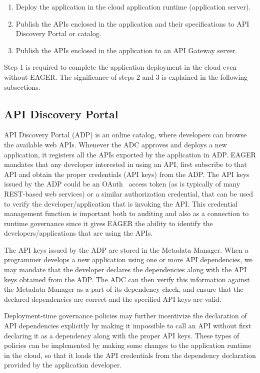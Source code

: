 \begin{enumerate}
\item Deploy the application in the cloud application runtime (application server).
\item Publish the APIs enclosed in the application and their specifications to
API Discovery Portal or catalog.
\item Publish the APIs enclosed in the application to an API Gateway server.
\end{enumerate}

Step 1 is required to complete the application deployment in the cloud even without EAGER. The significance of steps 2 and 3 is explained in the 
following subsections.

\subsection{API Discovery Portal} API Discovery Portal (ADP) is an online
catalog, where developers can browse the available web APIs. Whenever the ADC
approves and deploys a new application, it registers all the APIs exported by
the application in ADP.  EAGER mandates that any developer interested in using
an API, first subscribe to that API and obtain the proper credentials (API
keys) from the ADP. The API keys issued by the ADP could be an
OAuth~\cite{XXXOAuthXXXX} access
token (as is typically of many REST-based web services) 
or a similar authorization credential, that can be used to verify the
developer/application that is invoking the API. This credential management
function is
important both to auditing and also as a connection to
runtime governance since it gives EAGER the ability to identify
the developers/applications that are using the APIs. 

The API keys issued by the ADP are stored in the Metadata Manager. When a
programmer develops a new application using one or more API dependencies, we
may mandate that the developer declares the dependencies along with the API
keys obtained from the ADP. The ADC can then verify this information against
the Metadata Manager as a part of its dependency check, and ensure that the
declared dependencies are correct and the specified API keys are valid. 

Deployment-time governance policies
may further incentivize the declaration of API 
dependencies explicitly by making it 
impossible to call an API without first declaring it as a dependency along
with the proper API keys. These types of policies can be implemented
by making some changes to the
application runtime in the cloud, so that it loads the API credentials from
the dependency declaration provided by the application developer.

